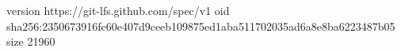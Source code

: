 version https://git-lfs.github.com/spec/v1
oid sha256:2350673916fc60e407d9ceeb109875ed1aba511702035ad6a8e8ba6223487b05
size 21960
